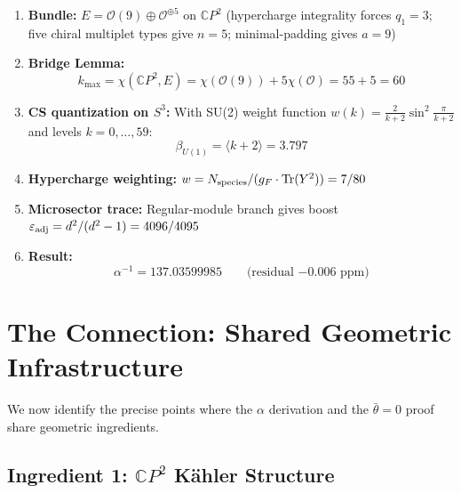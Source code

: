 \documentclass[11pt]{article}
\theoremstyle{remark}
\begin{document}
\begin{enumerate}
\item \textbf{Bundle:} $E = \mathcal{O}(9) \oplus \mathcal{O}^{\oplus 5}$
  on $\mathbb{C}P^2$ (hypercharge integrality forces $q_1 = 3$;
  five chiral multiplet types give $n = 5$; minimal-padding gives $a = 9$)

\item \textbf{Bridge Lemma:}
\begin{equation}
k_{\max} = \chi(\mathbb{C}P^2, E) = \chi(\mathcal{O}(9)) + 5\chi(\mathcal{O})
  = 55 + 5 = 60
\end{equation}

\item \textbf{CS quantization on $S^3$:} With SU(2) weight function
$w(k) = \frac{2}{k+2}\sin^2\frac{\pi}{k+2}$ and levels $k = 0, \ldots, 59$:
\begin{equation}
\beta_{U(1)} = \langle k + 2 \rangle = 3.797
\end{equation}

\item \textbf{Hypercharge weighting:}
$w = N_{\rm species}/(g_F \cdot \mathrm{Tr}(Y^2)) = 7/80$

\item \textbf{Microsector trace:} Regular-module branch gives boost
$\varepsilon_{\rm adj} = d^2/(d^2 - 1) = 4096/4095$

\item \textbf{Result:}
\begin{equation}
\boxed{\alpha^{-1} = 137.03599985 \qquad\text{(residual $-0.006$ ppm)}}
\end{equation}
\end{enumerate}

\section{The Connection: Shared Geometric Infrastructure}

We now identify the precise points where the $\alpha$ derivation and the
$\bar\theta = 0$ proof share geometric ingredients.

\subsection{Ingredient 1: $\mathbb{C}P^2$ K\"ahler Structure}
\end{document}

